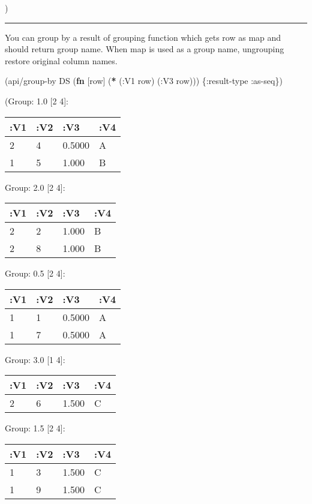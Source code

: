 \documentclass[]{article}
\newenvironment{Shaded}{\begin{snugshade}}{\end{snugshade}}
\newcommand{\KeywordTok}[1]{\textcolor[rgb]{0.13,0.29,0.53}{\textbf{#1}}}
\newcommand{\AttributeTok}[1]{\textcolor[rgb]{0.77,0.63,0.00}{#1}}
\newcommand{\NormalTok}[1]{#1}
\begin{document}
)

\begin{center}\rule{0.5\linewidth}{0.5pt}\end{center}

You can group by a result of grouping function which gets row as map and
should return group name. When map is used as a group name, ungrouping
restore original column names.

\begin{Shaded}
\begin{Highlighting}[]
\NormalTok{(api/group-by DS (}\KeywordTok{fn}\NormalTok{ [row] (}\KeywordTok{*}\NormalTok{ (}\AttributeTok{:V1}\NormalTok{ row)}
\NormalTok{                             (}\AttributeTok{:V3}\NormalTok{ row))) \{}\AttributeTok{:result-type} \AttributeTok{:as-seq}\NormalTok{\})}
\end{Highlighting}
\end{Shaded}

(Group: 1.0 {[}2 4{]}:

\begin{longtable}[]{@{}llll@{}}
\toprule
:V1 & :V2 & :V3 & :V4\tabularnewline
\midrule
\endhead
2 & 4 & 0.5000 & A\tabularnewline
1 & 5 & 1.000 & B\tabularnewline
\bottomrule
\end{longtable}

Group: 2.0 {[}2 4{]}:

\begin{longtable}[]{@{}llll@{}}
\toprule
:V1 & :V2 & :V3 & :V4\tabularnewline
\midrule
\endhead
2 & 2 & 1.000 & B\tabularnewline
2 & 8 & 1.000 & B\tabularnewline
\bottomrule
\end{longtable}

Group: 0.5 {[}2 4{]}:

\begin{longtable}[]{@{}llll@{}}
\toprule
:V1 & :V2 & :V3 & :V4\tabularnewline
\midrule
\endhead
1 & 1 & 0.5000 & A\tabularnewline
1 & 7 & 0.5000 & A\tabularnewline
\bottomrule
\end{longtable}

Group: 3.0 {[}1 4{]}:

\begin{longtable}[]{@{}llll@{}}
\toprule
:V1 & :V2 & :V3 & :V4\tabularnewline
\midrule
\endhead
2 & 6 & 1.500 & C\tabularnewline
\bottomrule
\end{longtable}

Group: 1.5 {[}2 4{]}:

\begin{longtable}[]{@{}llll@{}}
\toprule
:V1 & :V2 & :V3 & :V4\tabularnewline
\midrule
\endhead
1 & 3 & 1.500 & C\tabularnewline
1 & 9 & 1.500 & C\tabularnewline
\bottomrule
\end{longtable}
\end{document}
